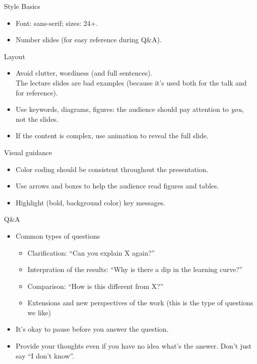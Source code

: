 \documentclass[usenames,dvipsnames,notes]{beamer}
\begin{document}
\begin{frame}
    {Style}
    Basics\\
    \begin{itemize}
        \item Font: sans-serif; sizes: 24+.
        \item Number slides (for easy reference during Q\&A).
    \end{itemize}

    Layout\\
    \begin{itemize}
        \item Avoid clutter, wordiness (and full sentences).\\
              The lecture slides are bad examples (because it's used both for the talk and for reference).
        \item Use keywords, diagrams, figures: the audience should pay attention to \textit{you}, not the slides.
        \item If the content is complex, use animation to reveal the full slide.
    \end{itemize}

    Visual guidance\\ 
    \begin{itemize}
        \item Color coding should be consistent throughout the presentation.
        \item Use arrows and boxes to help the audience read figures and tables.
        \item Highlight (bold, background color) key messages.
    \end{itemize}
\end{frame}

\begin{frame}
    {Q\&A}
    \begin{itemize}
        \item Common types of questions
            \begin{itemize}
                \item Clarification: ``Can you explain X again?''
                \item Interpration of the results: ``Why is there a dip in the learning curve?''
                \item Comparison: ``How is this different from X?''
                \item Extensions and new perspectives of the work (this is the type of questions we like)
            \end{itemize}
        \item It's okay to pause before you answer the question.
        \item Provide your thoughts even if you have no idea what's the answer. Don't just say ``I don't know''. 
    \end{itemize}
\end{frame}
\end{document}
